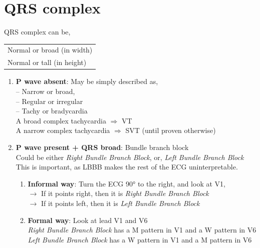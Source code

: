 \documentclass[11pt,a4paper]{report}
\begin{document}
\section{QRS complex}
QRS complex can be,  
\begin{center}
	\begin{tabular}{l} 
		\toprule[1.5pt]
		Normal or broad (in width)   \\
		Normal or tall (in height)  \\
		\bottomrule[1.5pt]
	\end{tabular}
\end{center}

\begin{enumerate}
	\item \textbf{P wave absent}: May be simply described as, \\
	-- Narrow or broad, \\
	-- Regular or irregular \\
	-- Tachy or bradycardia \\
	A broad complex tachycardia $\Rightarrow$ VT \\
	A narrow complex tachycardia $\Rightarrow$ SVT (until proven otherwise)
	\item \textbf{P wave present + QRS broad}: Bundle branch block \\
	Could be either \textit{Right Bundle Branch Block}, or, \textit{Left Bundle Branch Block} \\
	This is important, as LBBB makes the rest of the ECG uninterpretable.
	\begin{enumerate}
		\item \textbf{Informal way}: Turn the ECG \ang{90} to the right, and look at V1, \\
		$\rightarrow$ If it points right, then it is \textit{Right Bundle Branch Block} \\
		$\rightarrow$ If it points left, then it is \textit{Left Bundle Branch Block}
		\item \textbf{Formal way}: Look at lead V1 and V6\\
		\textit{Right Bundle Branch Block} has a M pattern in V1 and a W pattern in V6 \\
		\textit{Left Bundle Branch Block} has a W pattern in V1 and a M pattern in V6 \\
		\begin{center}

\end{center}
\end{enumerate}
\end{enumerate}
\end{document}
